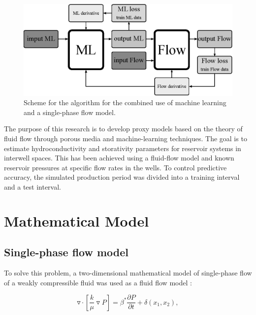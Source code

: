 \documentclass[
11pt,%
tightenlines,%
twoside,%
onecolumn,%
nofloats,%
nobibnotes,%
nofootinbib,%
superscriptaddress,%
noshowpacs,%
centertags]%
{revtex4}
\begin{document}
\begin{figure}
	\centering
	\includegraphics[width=0.7\linewidth]{images/fig1.eps}
	\caption{Scheme for the algorithm for the combined use of machine learning and a single-phase flow model.}
	\label{fig:schime1}
\end{figure}

The purpose of this research is to develop proxy models based on the theory of fluid flow through porous media and machine-learning techniques. The goal is to estimate hydroconductivity and storativity parameters for reservoir systems in interwell spaces. This has been achieved using a fluid-flow model and known reservoir pressures at specific flow rates in the wells. To control predictive accuracy, the simulated production period was divided into a training interval and a test interval.

\section{Mathematical Model}

\subsection{Single-phase flow model}
To solve this problem, a two-dimensional mathematical model of single-phase flow of a
weakly compressible fluid was used as a fluid flow model \cite{bas}:

\begin{equation} \label{fil}
	\triangledown \cdot \left[\frac{k}{\mu}\triangledown P \right] = \beta^* \frac{\partial P}{\partial t} + \delta(x_1,x_2),
\end{equation}
\end{document}
